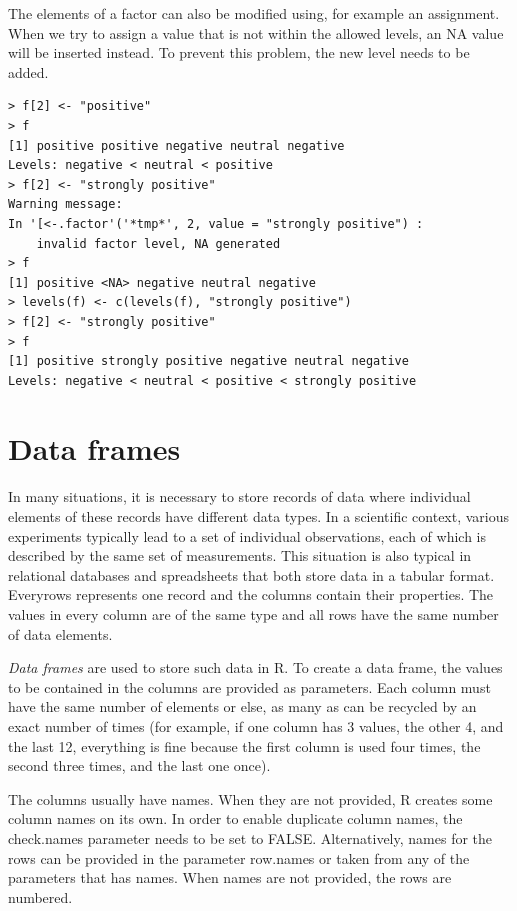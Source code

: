 \documentclass[11pt,openany,executivepaper]{book}
\begin{document}
The elements of a factor can also be modified using, for example an assignment. When we try to assign a value that is not within the allowed levels, an NA value will be inserted instead. To prevent this problem, the new level needs to be added.

\begin{verbatim}
> f[2] <- "positive"
> f
[1] positive positive negative neutral negative
Levels: negative < neutral < positive
> f[2] <- "strongly positive"
Warning message:
In '[<-.factor'('*tmp*', 2, value = "strongly positive") :
    invalid factor level, NA generated
> f
[1] positive <NA> negative neutral negative
> levels(f) <- c(levels(f), "strongly positive")
> f[2] <- "strongly positive"
> f
[1] positive strongly positive negative neutral negative
Levels: negative < neutral < positive < strongly positive
\end{verbatim}

\section{Data frames}
In many situations, it is necessary to store records of data where individual elements of these records have different data types. In a scientific context, various experiments typically lead to a set of individual observations, each of which is described by the same set of measurements. This situation is also typical in relational databases and spreadsheets that both store data in a tabular format. Everyrows represents one record and the columns contain their properties. The values in every column are of the same type and all rows have the same number of data elements.

\textit{Data frames} are used to store such data in R. To create a data frame, the values to be contained in the columns are provided as parameters. Each column must have the same number of elements or else, as many as can be recycled by an exact number of times (for example, if one column has 3 values, the other 4, and the last 12, everything is fine because the first column is used four times, the second three times, and the last one once).

The columns usually have names. When they are not provided, R creates some column names on its own. In order to enable duplicate column names, the check.names parameter needs to be set to FALSE. Alternatively, names for the rows can be provided in the parameter row.names or taken from any of the parameters that has names. When names are not provided, the rows are numbered.
\end{document}
